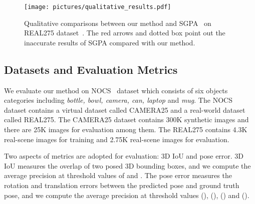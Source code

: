 \documentclass{article}
\begin{document}
 
\begin{figure}
    \centering
    \setlength{\abovecaptionskip}{0.2cm}
    \texttt{[image: pictures/qualitative\_results.pdf]}
    \caption{Qualitative comparisons between our method and SGPA~\cite{SGPA} on REAL275 dataset~\cite{NOCS}. The red arrows and dotted box point out the inaccurate results of SGPA compared with our method.}
    \label{fig:Qualitative}
    \vspace{-0.4cm}
\end{figure}

\subsection{Datasets and Evaluation Metrics}
We evaluate our method on NOCS~\cite{NOCS} dataset which consists of six objects categories including \textit{bottle, bowl, camera, can, laptop} and \textit{mug}. The NOCS dataset contains a virtual dataset called CAMERA25 and a real-world dataset called REAL275. The CAMERA25 dataset contains 300K synthetic images and there are 25K images for evaluation among them. The REAL275 contains 4.3K real-scene images for training and 2.75K real-scene images for evaluation.

Two aspects of metrics are adopted for evaluation: 3D IoU and pose error. 3D IoU measures the overlap of two posed 3D bounding boxes, and we compute the average precision at threshold values of  and . The pose error measures the rotation and translation errors between the predicted pose and ground truth pose, and we compute the average precision at threshold values (), (), () and (). 
\end{document}
